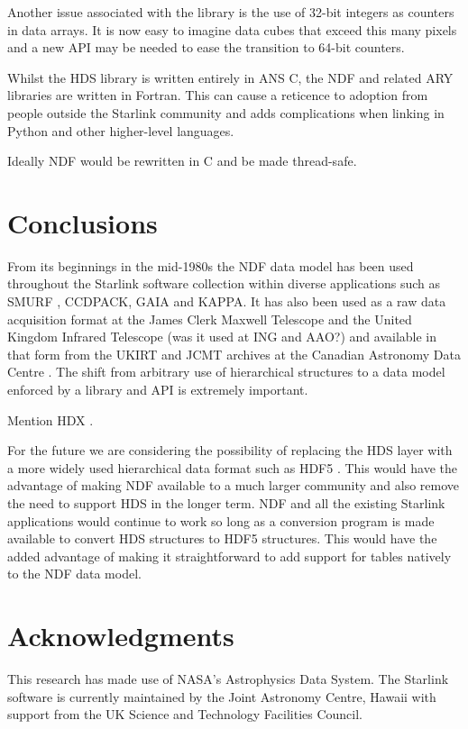 \documentclass[final,authoryear,5p,times,twocolumn]{elsarticle}
\begin{document}
{Another issue associated with the library is the use of 32-bit
integers as counters in data arrays. It is now easy to imagine data
cubes that exceed this many pixels and a new API may be needed to ease
the transition to 64-bit counters.

Whilst the HDS library is written entirely in ANS C, the NDF and
related ARY libraries are written in Fortran. This can cause a
reticence to adoption from people outside the Starlink community and
adds complications when linking in Python and other higher-level
languages.

Ideally NDF would be rewritten in C and be made thread-safe.

\section{Conclusions}

From its beginnings in the mid-1980s the NDF data model has been used
throughout the Starlink software collection within diverse
applications such as SMURF \citep{2013MNRAS.430.2545C}, CCDPACK, GAIA
and KAPPA. It has also been used as a raw data acquisition format at the
James Clerk Maxwell Telescope and the United Kingdom Infrared
Telescope (was it used at ING and AAO?) and available in that form
from the UKIRT and JCMT archives at the Canadian Astronomy Data Centre
\citep{2008ASPC..394..450E,P01_adassxxiii}. The shift from arbitrary
use of hierarchical structures to a data model enforced by a library
and API is extremely important.

{\color{red} Mention HDX \citep{2003ASPC..295..221G}.}

For the future we are considering the possibility of replacing the HDS
layer with a more widely used hierarchical data format such as HDF5
\citep{Folk:2011:OHT:1966895.1966900}. This would have the advantage
of making NDF available to a much larger community and also remove the
need to support HDS in the longer term. NDF and all the existing
Starlink applications would continue to work so long as a conversion
program is made available to convert HDS structures to HDF5 structures.
This would have the added advantage of making it straightforward to
add support for tables natively to the NDF data model.

\section{Acknowledgments}

This research has made use of NASA's Astrophysics Data System.
The Starlink software is currently maintained by the Joint Astronomy
Centre, Hawaii with support from the UK Science and Technology
Facilities Council.

}
\end{document}
